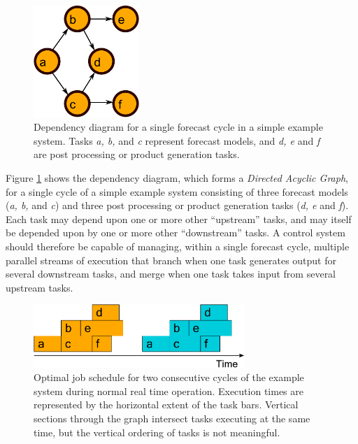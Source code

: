 \documentclass[11pt,a4paper]{article}
\begin{document}
\begin{figure}
    \begin{center}
        \includegraphics[width=4cm]{dependencies-one}
    \end{center}
    \caption{\small Dependency diagram for a single forecast cycle
    in a simple example system. Tasks {\em a, b,} and {\em c} represent
    forecast models, and {\em d, e} and {\em f} are post processing or
    product generation tasks.}
    \label{fig-dep-one}
\end{figure}
Figure \ref{fig-dep-one} shows the dependency diagram, which forms a
{\em Directed Acyclic Graph}, for a single cycle of a simple example
system consisting of three forecast models ({\em a, b,} and {\em c}) and
three post processing or product generation tasks ({\em d, e} and {\em
f}).  Each task may depend upon one or more other ``upstream'' tasks,
and may itself be depended upon by one or more other ``downstream''
tasks.  A control system should therefore be capable of managing, within
a single forecast cycle, multiple parallel streams of execution that
branch when one task generates output for several downstream tasks, and
merge when one task takes input from several upstream tasks. 

\begin{figure}
    \begin{center}
        \includegraphics[width=8cm]{timeline-one}
    \end{center}
    \caption{\small Optimal job schedule for two consecutive cycles of
    the example system during normal real time operation. Execution
    times are represented by the horizontal extent of the task bars. 
    Vertical sections through the graph intersect tasks executing at
    the same time, but the vertical ordering of tasks is not
    meaningful.}
    \label{fig-time-one}
\end{figure}
\end{document}
